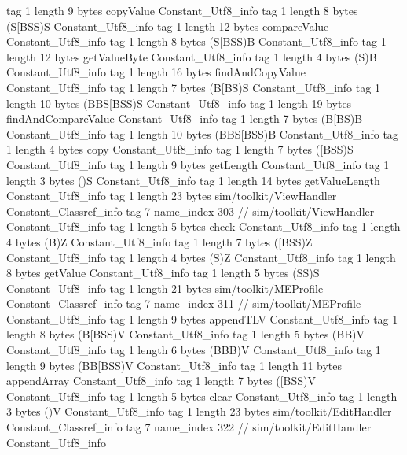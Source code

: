 {{{			tag	1
			length	9
			bytes	copyValue
		}
		Constant_Utf8_info {
			tag	1
			length	8
			bytes	(S[BSS)S
		}
		Constant_Utf8_info {
			tag	1
			length	12
			bytes	compareValue
		}
		Constant_Utf8_info {
			tag	1
			length	8
			bytes	(S[BSS)B
		}
		Constant_Utf8_info {
			tag	1
			length	12
			bytes	getValueByte
		}
		Constant_Utf8_info {
			tag	1
			length	4
			bytes	(S)B
		}
		Constant_Utf8_info {
			tag	1
			length	16
			bytes	findAndCopyValue
		}
		Constant_Utf8_info {
			tag	1
			length	7
			bytes	(B[BS)S
		}
		Constant_Utf8_info {
			tag	1
			length	10
			bytes	(BBS[BSS)S
		}
		Constant_Utf8_info {
			tag	1
			length	19
			bytes	findAndCompareValue
		}
		Constant_Utf8_info {
			tag	1
			length	7
			bytes	(B[BS)B
		}
		Constant_Utf8_info {
			tag	1
			length	10
			bytes	(BBS[BSS)B
		}
		Constant_Utf8_info {
			tag	1
			length	4
			bytes	copy
		}
		Constant_Utf8_info {
			tag	1
			length	7
			bytes	([BSS)S
		}
		Constant_Utf8_info {
			tag	1
			length	9
			bytes	getLength
		}
		Constant_Utf8_info {
			tag	1
			length	3
			bytes	()S
		}
		Constant_Utf8_info {
			tag	1
			length	14
			bytes	getValueLength
		}
		Constant_Utf8_info {
			tag	1
			length	23
			bytes	sim/toolkit/ViewHandler
		}
		Constant_Classref_info {
			tag	7
			name_index	303		// sim/toolkit/ViewHandler
		}
		Constant_Utf8_info {
			tag	1
			length	5
			bytes	check
		}
		Constant_Utf8_info {
			tag	1
			length	4
			bytes	(B)Z
		}
		Constant_Utf8_info {
			tag	1
			length	7
			bytes	([BSS)Z
		}
		Constant_Utf8_info {
			tag	1
			length	4
			bytes	(S)Z
		}
		Constant_Utf8_info {
			tag	1
			length	8
			bytes	getValue
		}
		Constant_Utf8_info {
			tag	1
			length	5
			bytes	(SS)S
		}
		Constant_Utf8_info {
			tag	1
			length	21
			bytes	sim/toolkit/MEProfile
		}
		Constant_Classref_info {
			tag	7
			name_index	311		// sim/toolkit/MEProfile
		}
		Constant_Utf8_info {
			tag	1
			length	9
			bytes	appendTLV
		}
		Constant_Utf8_info {
			tag	1
			length	8
			bytes	(B[BSS)V
		}
		Constant_Utf8_info {
			tag	1
			length	5
			bytes	(BB)V
		}
		Constant_Utf8_info {
			tag	1
			length	6
			bytes	(BBB)V
		}
		Constant_Utf8_info {
			tag	1
			length	9
			bytes	(BB[BSS)V
		}
		Constant_Utf8_info {
			tag	1
			length	11
			bytes	appendArray
		}
		Constant_Utf8_info {
			tag	1
			length	7
			bytes	([BSS)V
		}
		Constant_Utf8_info {
			tag	1
			length	5
			bytes	clear
		}
		Constant_Utf8_info {
			tag	1
			length	3
			bytes	()V
		}
		Constant_Utf8_info {
			tag	1
			length	23
			bytes	sim/toolkit/EditHandler
		}
		Constant_Classref_info {
			tag	7
			name_index	322		// sim/toolkit/EditHandler
		}
		Constant_Utf8_info {
}}}

